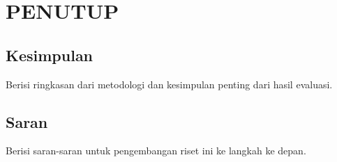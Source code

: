
\chapter{PENUTUP}
\label{cha:5-PENUTUP}

\section{Kesimpulan}
\label{sec:5-Kesimpulan}

Berisi ringkasan dari metodologi dan kesimpulan penting dari hasil evaluasi.

\section{Saran}
\label{sec:5-Saran}

Berisi saran-saran untuk pengembangan riset ini ke langkah ke depan.
